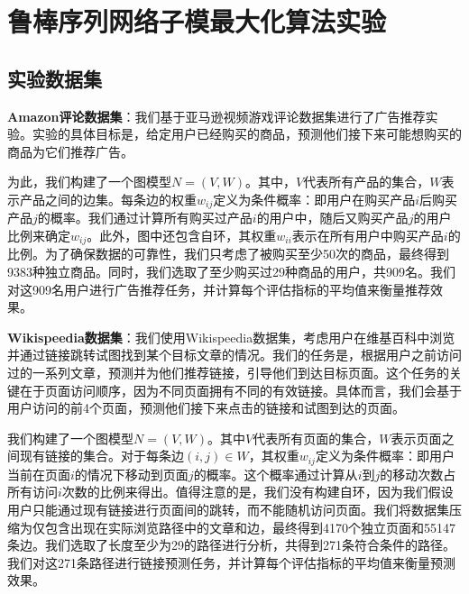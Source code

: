 
\section{鲁棒序列网络子模最大化算法实验}
\label{sec:5_1}

\subsection{实验数据集}

{\bfseries Amazon评论数据集}：我们基于亚马逊视频游戏评论数据集\cite{ni2019justifying}进行了广告推荐实验。实验的具体目标是，给定用户已经购买的商品，预测他们接下来可能想购买的商品为它们推荐广告。

为此，我们构建了一个图模型$N = (V,W)$。其中，$V$代表所有产品的集合，$W$表示产品之间的边集。每条边的权重$w_{ij}$定义为条件概率：即用户在购买产品$i$后购买产品$j$的概率。我们通过计算所有购买过产品$i$的用户中，随后又购买产品$j$的用户比例来确定$w_{ij}$。此外，图中还包含自环，其权重$w_{ii}$表示在所有用户中购买产品$i$的比例。为了确保数据的可靠性，我们只考虑了被购买至少50次的商品，最终得到9383种独立商品。同时，我们选取了至少购买过29种商品的用户，共909名。我们对这909名用户进行广告推荐任务，并计算每个评估指标的平均值来衡量推荐效果。

{\bfseries Wikispeedia数据集}：我们使用Wikispeedia数据集\cite{west2009wikispeedia}，考虑用户在维基百科中浏览并通过链接跳转试图找到某个目标文章的情况。我们的任务是，根据用户之前访问过的一系列文章，预测并为他们推荐链接，引导他们到达目标页面。这个任务的关键在于页面访问顺序，因为不同页面拥有不同的有效链接。具体而言，我们会基于用户访问的前4个页面，预测他们接下来点击的链接和试图到达的页面。

我们构建了一个图模型$N = (V,W)$。其中$V$代表所有页面的集合，$W$表示页面之间现有链接的集合。对于每条边$(i,j)\in W$，其权重$w_{ij}$定义为条件概率：即用户当前在页面$i$的情况下移动到页面$j$的概率。这个概率通过计算从$i$到$j$的移动次数占所有访问$i$次数的比例来得出。值得注意的是，我们没有构建自环，因为我们假设用户只能通过现有链接进行页面间的跳转，而不能随机访问页面。我们将数据集压缩为仅包含出现在实际浏览路径中的文章和边，最终得到4170个独立页面和55147条边。我们选取了长度至少为29的路径进行分析，共得到271条符合条件的路径。我们对这271条路径进行链接预测任务，并计算每个评估指标的平均值来衡量预测效果。



